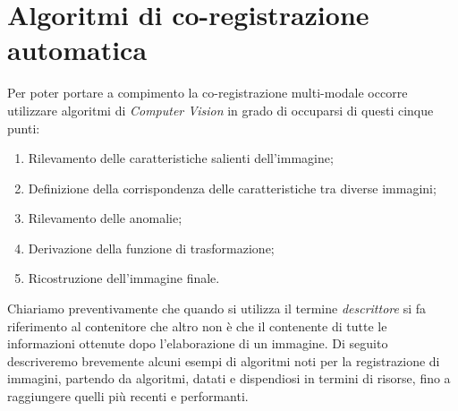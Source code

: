\section{Algoritmi di co-registrazione automatica}
Per poter portare a compimento la co-registrazione multi-modale occorre utilizzare algoritmi di \textit{Computer Vision} in grado di occuparsi di questi cinque punti:
\begin{enumerate}
	\item Rilevamento delle caratteristiche salienti dell'immagine; 
	\item Definizione della corrispondenza delle caratteristiche tra diverse immagini;
	\item Rilevamento delle anomalie;
	\item Derivazione della funzione di trasformazione; 
	\item Ricostruzione dell'immagine finale.
\end{enumerate}
\noindent Chiariamo preventivamente che quando si utilizza il termine \textit{descrittore} si fa riferimento al contenitore che altro non è che il contenente di tutte le informazioni ottenute dopo l'elaborazione di un immagine. Di seguito descriveremo brevemente alcuni esempi di algoritmi noti per la registrazione di immagini, partendo da algoritmi, datati e dispendiosi in termini di risorse, fino a raggiungere quelli più recenti e performanti. \par
